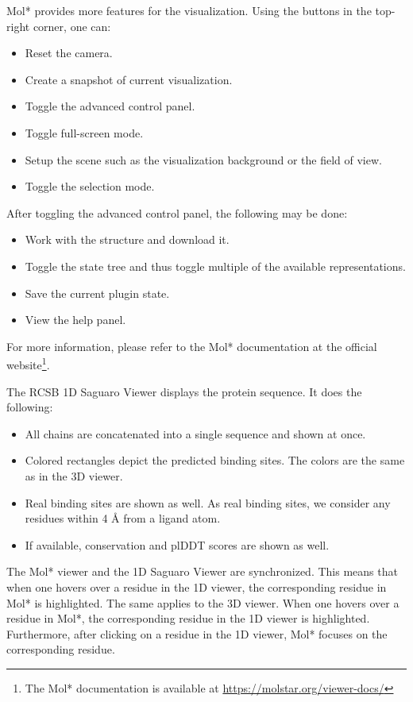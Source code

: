 Mol* provides more features for the visualization. Using the buttons in the top-right corner, one can:

\begin{itemize}
    \item Reset the camera.
    \item Create a snapshot of current visualization.
    \item Toggle the advanced control panel.
    \item Toggle full-screen mode.
    \item Setup the scene such as the visualization background or the field of view.
    \item Toggle the selection mode.
\end{itemize}

After toggling the advanced control panel, the following may be done:

\begin{itemize}
    \item Work with the structure and download it.
    \item Toggle the state tree and thus toggle multiple of the available representations.
    \item Save the current plugin state.
    \item View the help panel.
\end{itemize}

For more information, please refer to the Mol* documentation at the official website\footnote{The Mol* documentation is available at \url{https://molstar.org/viewer-docs/}}.

The RCSB 1D Saguaro Viewer displays the protein sequence. It does the following:

\begin{itemize}
    \item All chains are concatenated into a single sequence and shown at once.
    \item Colored rectangles depict the predicted binding sites. The colors are the same as in the 3D viewer.
    \item Real binding sites are shown as well. As real binding sites, we consider any residues within 4 \AA{} from a ligand atom.
    \item If available, conservation and plDDT scores are shown as well.
\end{itemize}

The Mol* viewer and the 1D Saguaro Viewer are synchronized. This means that when one hovers over a residue in the 1D viewer, the corresponding residue in Mol* is highlighted. The same applies to the 3D viewer. When one hovers over a residue in Mol*, the corresponding residue in the 1D viewer is highlighted. Furthermore, after clicking on a residue in the 1D viewer, Mol* focuses on the corresponding residue.

